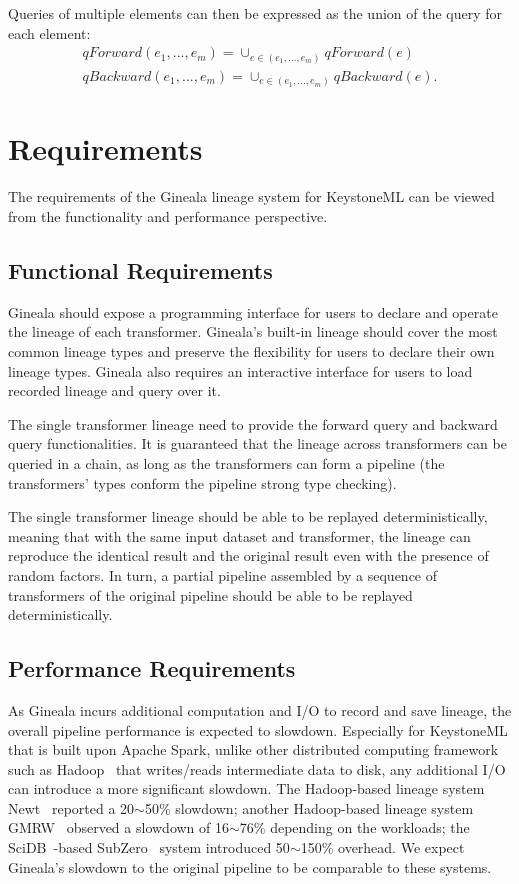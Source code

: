 \documentclass{sig-alternate}
\begin{document}
Queries of multiple elements can then be expressed as the union of the query for each element: 
\begin{equation}
\begin{split}
qForward(e_1, ..., e_m) = \cup_{e \in (e_1, ..., e_m)} qForward(e) \\
qBackward(e_1, ..., e_m) = \cup_{e \in (e_1, ..., e_m)} qBackward(e).
\end{split}
\end{equation}

\section{Requirements}
\label{sec:Req}
The requirements of the Gineala lineage system for KeystoneML can be viewed from the functionality and performance perspective.

\subsection{Functional Requirements}
Gineala should expose a programming interface for users to declare and operate the lineage of each transformer. 
Gineala's built-in lineage should cover the most common lineage types and preserve the flexibility for users to declare their own lineage types.
Gineala also requires an interactive interface for users to load recorded lineage and query over it.

The single transformer lineage need to provide the forward query and backward query functionalities. 
It is  guaranteed that the lineage across transformers can be queried in a chain, as long as the transformers
can form a pipeline (the transformers' types conform the pipeline strong type checking).

The single transformer lineage should be able to be replayed deterministically, meaning that with the same input dataset and transformer,
the lineage can reproduce the identical result and the original result even with the presence of random factors.
In turn, a partial pipeline assembled by a sequence of transformers of the original pipeline should be able to be replayed deterministically.

\subsection{Performance Requirements}
\label{sec:Req-Perf}
As Gineala incurs additional computation and I/O to record and save lineage, the overall pipeline performance is expected to slowdown.
Especially for KeystoneML that is built upon Apache Spark, unlike other distributed computing framework such as Hadoop~\cite{HADOOP} 
that writes/reads intermediate data to disk, any additional I/O can introduce a more significant slowdown. 
The Hadoop-based lineage system Newt~\cite{logothetis13} reported a 20$\sim$50\% slowdown; 
another Hadoop-based lineage system GMRW~\cite{ikeda11} observed a slowdown of 16$\sim$76\% depending on the workloads;
the SciDB~\cite{brown10}-based SubZero~\cite{wu13} system introduced 50$\sim$150\% overhead. 
We expect Gineala's slowdown to the original pipeline to be comparable to these systems.
\end{document}
